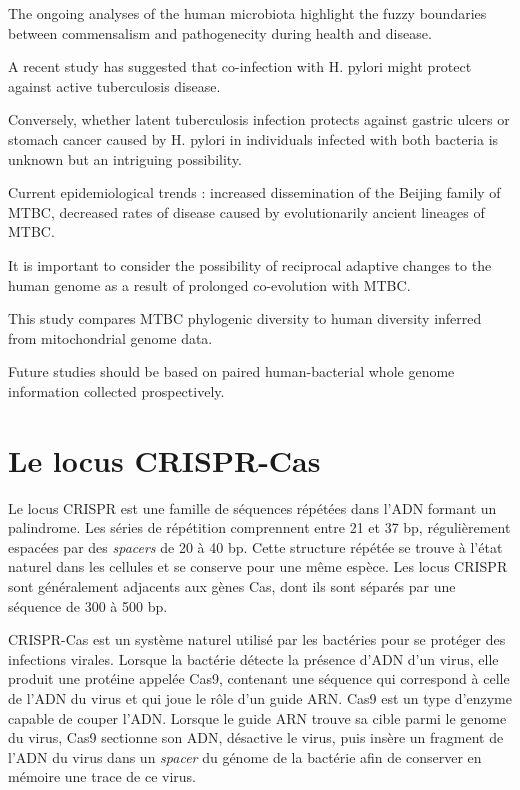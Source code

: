 \documentclass[twoside,a4paper,12pt,frenchb,openany]{report}
\begin{document}
The ongoing analyses of the human microbiota highlight the fuzzy boundaries between commensalism and pathogenecity during health and disease.

A recent study has suggested that co-infection with H. pylori might protect against active tuberculosis disease.

Conversely, whether latent tuberculosis infection protects against gastric ulcers or stomach cancer caused by H. pylori in individuals infected with both bacteria is unknown but an intriguing possibility.

Current epidemiological trends : increased dissemination of the Beijing family of MTBC, decreased rates of disease caused by evolutionarily ancient lineages of MTBC.

It is important to consider the possibility of reciprocal adaptive changes to the human genome as a result of prolonged co-evolution with MTBC.

This study compares MTBC phylogenic diversity to human diversity inferred from mitochondrial genome data.

Future studies should be based on paired human-bacterial whole genome information collected prospectively.

\section{Le locus CRISPR-Cas}

Le locus CRISPR est une famille de séquences répétées dans l'ADN formant un palindrome. Les séries de répétition comprennent entre 21 et 37 bp, régulièrement espacées par des \textit{spacers} de 20 à 40 bp. Cette structure répétée se trouve à l'état naturel dans les cellules et se conserve pour une même espèce. Les locus CRISPR sont généralement adjacents aux gènes Cas, dont ils sont séparés par une séquence de 300 à 500 bp.

CRISPR-Cas est un système naturel utilisé par les bactéries pour se protéger des infections virales. Lorsque la bactérie détecte la présence d'ADN d'un virus, elle produit une protéine appelée Cas9, contenant une séquence qui correspond à celle de l'ADN du virus et qui joue le rôle d'un guide ARN. Cas9 est un type d'enzyme capable de couper l'ADN. Lorsque le guide ARN trouve sa cible parmi le genome du virus, Cas9 sectionne son ADN, désactive le virus, puis insère un fragment de l'ADN du virus dans un \textit{spacer} du génome de la bactérie afin de conserver en mémoire une trace de ce virus.
\end{document}
